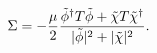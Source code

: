 \begin{equation}
\Sigma = -{\mu \over 2}
{\tilde \phi^\dagger T \tilde \phi 
+ \tilde \chi T \tilde \chi^\dagger \over 
|\tilde \phi|^2+|\tilde \chi|^2 } .
\end{equation}

